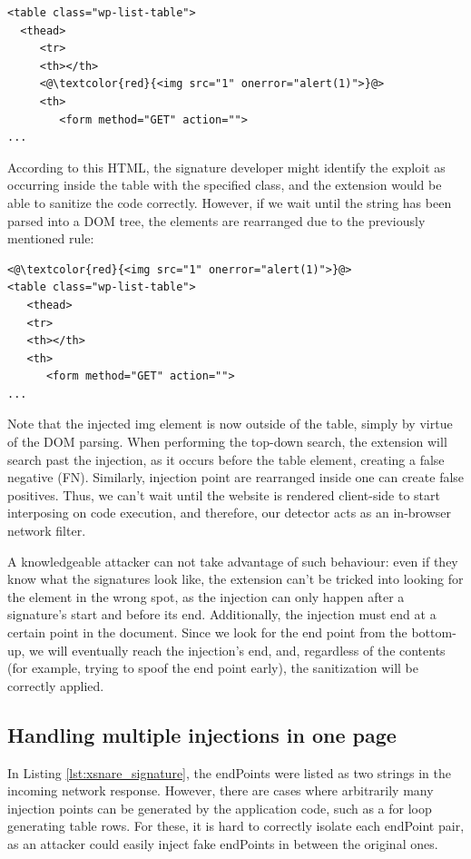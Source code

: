 \begin{lstlisting}
<table class="wp-list-table">
  <thead>
     <tr>
     <th></th>
     <@\textcolor{red}{<img src="1" onerror="alert(1)">}@>
     <th>
   	    <form method="GET" action="">
...
\end{lstlisting}

According to this HTML, the signature developer might identify the exploit as occurring inside the table with the specified class, and the extension would be able to sanitize the code correctly. However, if we wait until the string has been parsed into a DOM tree, the elements are rearranged due to the previously mentioned rule:

\begin{lstlisting}
<@\textcolor{red}{<img src="1" onerror="alert(1)">}@>
<table class="wp-list-table">
   <thead>
   <tr>
   <th></th>
   <th>
      <form method="GET" action="">
...
\end{lstlisting}

Note that the injected img element is now outside of the table, simply by virtue of the DOM parsing. When performing the top-down search, the extension will search past the injection, as it occurs before the table element, creating a false negative (FN). Similarly, injection point are rearranged inside one can create false positives. Thus, we can't wait until the website is rendered client-side to start interposing on code execution, and therefore, our detector acts as an in-browser network filter.

A knowledgeable attacker can not take advantage of such behaviour: even if they know what the signatures look like, the extension can't be tricked into looking for the element in the wrong spot, as the injection can only happen after a signature's start and before its end. Additionally, the injection must end at a certain point in the document. Since we look for the end point from the bottom-up, we will eventually reach the injection's end, and, regardless of the contents (for example, trying to spoof the end point early), the sanitization will be correctly applied.

\subsection{Handling multiple injections in one page} \label{multiple_injections}
In Listing \ref{lst:xsnare_signature}, the endPoints were listed as two strings in the incoming network response. However, there are cases where arbitrarily many injection points can be generated by the application code, such as a for loop generating table rows. For these, it is hard to correctly isolate each endPoint pair, as an attacker could easily inject fake endPoints in between the original ones.

